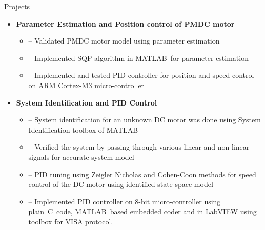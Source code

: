 \documentclass[11pt]{resume}
\newcommand{\mt}{\textsc{MATLAB}}
\newcommand\cp{C\nolinebreak[4]\hspace{-.05em}\raisebox{.4ex}{\relsize{-3}{\textbf{}}}}
\newenvironment{outerlist}[1][\enskip\textbullet]%
{\begin{itemize}[#1,leftmargin=*]}{\end{itemize}%
	\vspace{-.5\baselineskip}}
\newenvironment{innerlist}[1][\enskip\textbullet]%
{\begin{itemize}[#1,leftmargin=*,parsep=0pt,itemsep=0pt,topsep=0pt,partopsep=0pt]}
	{\end{itemize}}
\begin{document}
\begin{rSection}{Projects}
\begin{outerlist}
		\item \textbf{Parameter Estimation and Position control of PMDC motor} 
		\begin{innerlist}
			\item[--] Validated PMDC motor model using parameter estimation
			\item[--] Implemented SQP algorithm in \mt~for parameter estimation
			\item[--] Implemented and tested PID controller for position and speed control on ARM Cortex-M$ 3 $ micro-controller
		\end{innerlist}	
	
		\item \textbf{System Identification and PID Control} 
		\begin{innerlist}
			\item[--] System identification for an unknown DC motor was done using System Identification toolbox of \mt
			\item[--] Verified the system by passing through various linear and non-linear signals for accurate system model
			\item[--] PID tuning using Zeigler Nicholas and Cohen-Coon methods for speed control of the DC motor using identified state-space model 
			\item[--] Implemented PID controller on $8$-bit micro-controller using plain~\cp~code, \mt~based embedded coder and in LabVIEW using toolbox for VISA protocol.
		\end{innerlist}		
	\end{outerlist}
\end{rSection}
\end{document}

